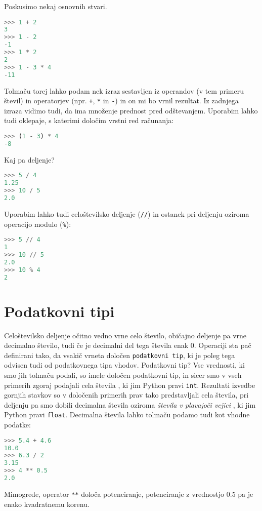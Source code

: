 Poskusimo nekaj osnovnih stvari.
\begin{lstlisting}[language=Python]
>>> 1 + 2
3
>>> 1 - 2
-1
>>> 1 * 2
2
>>> 1 - 3 * 4
-11
\end{lstlisting}
Tolmaču torej lahko podam nek izraz sestavljen iz operandov (v tem primeru števil) in operatorjev (npr. \texttt{+}, \texttt{*} in \texttt{-}) in on mi bo vrnil rezultat. Iz zadnjega izraza vidimo tudi, da ima množenje prednost pred odštevanjem. Uporabim lahko tudi oklepaje, s katerimi določim vrstni red računanja:
\begin{lstlisting}[language=Python]
>>> (1 - 3) * 4
-8
\end{lstlisting}
Kaj pa deljenje? 
\begin{lstlisting}[language=Python]
>>> 5 / 4
1.25
>>> 10 / 5
2.0
\end{lstlisting}
Uporabim lahko tudi celoštevilsko deljenje (\texttt{//}) in ostanek pri deljenju oziroma operacijo modulo (\texttt{\%}): 
\begin{lstlisting}[language=Python]
>>> 5 // 4
1
>>> 10 // 5
2.0
>>> 10 % 4
2
\end{lstlisting}

\section{Podatkovni tipi}

Celoštevilsko deljenje očitno vedno vrne celo število, običajno deljenje pa vrne decimalno število, tudi če je decimalni del tega števila enak 0. Operaciji sta pač definirani tako, da vsakič vrneta določen \texttt{podatkovni tip}, ki je poleg tega odvisen tudi od podatkovnega tipa vhodov. Podatkovni tip? Vse vrednosti, ki smo jih tolmaču podali, so imele določen podatkovni tip, in sicer smo v vseh primerih zgoraj podajali cela števila , ki jim Python pravi \texttt{int}. Rezultati izvedbe gornjih stavkov so v določenih primerih prav tako predstavljali cela števila, pri deljenju pa smo dobili decimalna števila oziroma \emph{števila v plavajoči vejici} , ki jim Python pravi \texttt{float}. Decimalna števila lahko tolmaču podamo tudi kot vhodne podatke:
\begin{lstlisting}[language=Python]
>>> 5.4 + 4.6
10.0
>>> 6.3 / 2
3.15
>>> 4 ** 0.5
2.0
\end{lstlisting}
Mimogrede, operator \texttt{**} določa potenciranje, potenciranje z vrednostjo 0.5 pa je enako kvadratnemu korenu. 


